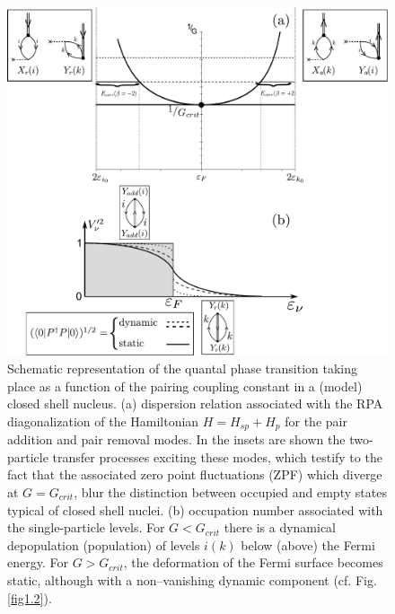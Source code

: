   \begin{figure}
  \centerline{\includegraphics*[width=\textwidth,angle=0]{nutshell/figs/fig1E6.pdf}}
  \caption{Schematic representation of the quantal phase transition taking place as a function of the pairing coupling
  constant in a (model) closed shell nucleus. (a)
  dispersion relation associated with the RPA diagonalization of the Hamiltonian
  $H = H_{sp} + H_p$ for the pair addition and pair removal modes. In the insets are
  shown the two-particle transfer processes exciting these modes, which testify to
  the fact that the associated zero point fluctuations (ZPF) which diverge at
  $G = G_{crit}$, blur the distinction between occupied and empty states typical of
  closed shell nuclei. (b) occupation number associated with the single-particle
  levels. For $G < G_{crit}$ there is a dynamical depopulation (population) of levels
  $ i(k)$ below (above) the Fermi energy. For $G > G_{crit}$,
  the deformation of the Fermi
  surface becomes static, although with a non--vanishing dynamic component (cf. Fig. \ref{fig1.2}).}\label{fig1E6}
  \end{figure}
